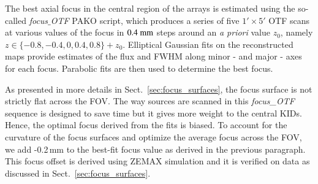 The best axial focus in the central region of the arrays is estimated using the
so-called \emph{focus$\_$OTF} PAKO script, which produces a series of
five $1'\times 5'$ OTF scans at various values of the focus in $0.4~\rm{mm}$ steps
around an \emph{a priori} value $z_0$, namely
$z \in \{-0.8, -0.4, 0, 0.4, 0.8\} + z_0$.
Elliptical Gaussian fits on the reconstructed maps provide estimates of
the flux and FWHM along minor - and major - axes for each focus. Parabolic fits are
then used to determine the best focus.

As presented in more details in Sect.~\ref{sec:focus_surfaces}, the focus
surface is not strictly flat across the FOV. The way sources are scanned in
this \emph{focus\_OTF} sequence is designed to save time but it gives more weight
to the central KIDs. Hence, the optimal focus derived from the fits is
biased. To account for the curvature of the focus surfaces and optimize the
average focus across the FOV, we add -0.2\,mm to the best-fit focus value as derived
in the previous paragraph. This focus offset is derived using ZEMAX
simulation and it is verified on data as discussed in
Sect.~\ref{sec:focus_surfaces}.


